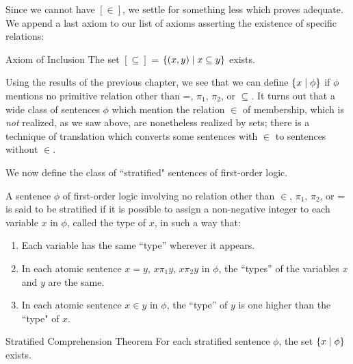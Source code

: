 Since we cannot have $[\in]$, we settle for something less which
proves adequate.  We append a last axiom to our list of axioms
asserting the existence of specific relations:

\begin{axiom}{Axiom of Inclusion}
 The set $[\subseteq]$ = $\{(x,y) \mid x \subseteq y\}$ exists.
\end{axiom}

Using the results of the previous chapter, we see that we can
define\linebreak
$\{x \mid \phi\}$ if $\phi$ mentions no primitive relation other than =,
$\pi_1$, $\pi_2$, or $\subseteq$.  It turns out that a wide class of sentences
$\phi$ which mention the relation $\in$ of membership, which
is {\itshape not\/} realized, as we 
saw above, are nonetheless realized by sets; there is a technique of
translation which converts some sentences with $\in$ to sentences without
$\in$.

We now define the class of ``stratified" sentences of
first-order logic.  

\begin{definition}
 A sentence $\phi$ of first-order logic involving no relation other than $\in$, $\pi_1$, $\pi_2$, or = is said to be
 {\upshape stratified} if it is possible to assign a non-negative integer to
 each
 variable $x$ in $\phi$, called the {\upshape type} of $x$, in such a way
 that:
 \begin{enumerate}
  \item  Each variable has the same ``type'' wherever it appears.
  \item  In each atomic sentence $x = y$, $x \mathrel{\pi_1} y$,
    $x \mathrel{\pi_2} y$ in
    $\phi$, the ``types'' of the variables $x$ and $y$ are the same.
  \item  In each atomic sentence $x \in y$ in $\phi$, the ``type'' of $y$
    is one higher than the ``type" of $x$.
\end{enumerate}
\end{definition}

\begin{Thm}{Stratified Comprehension Theorem}
 For each stratified sentence $\phi$, the set $\{x \mid \phi\}$ exists.
\end{Thm}

